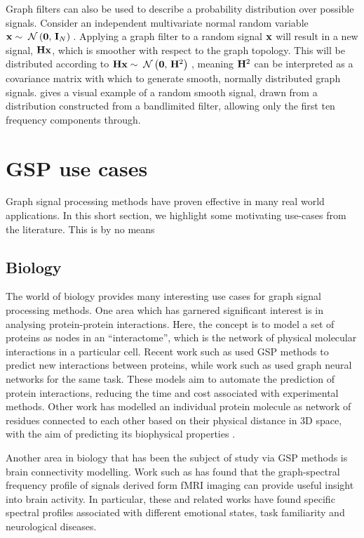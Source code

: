 Graph filters can also be used to describe a probability distribution over possible signals. Consider an independent multivariate normal random variable $\mathbf{x} \sim \; \mathcal{N}\left(\mathbf{0}, \, \mathbf{I}_N\right) \;$. Applying a graph filter to a random signal $\mathbf{x}$ will result in a new signal, $\mathbf{H} \mathbf{x}$, which is smoother with respect to the graph topology. This will be distributed according to $\mathbf{H} \mathbf{x} \sim \; \mathcal{N}\left(\mathbf{0}, \, \mathbf{H}^2\right) \;$, meaning $\mathbf{H}^2$ can be interpreted as a covariance matrix with which to generate smooth, normally distributed graph signals.  gives a visual example of a random smooth signal, drawn from a distribution constructed from a bandlimited filter, allowing only the first ten frequency components through. 



\section{GSP use cases}

Graph signal processing methods have proven effective in many real world applications. In this short section, we highlight some motivating use-cases from the literature. This is by no means 

\subsection{Biology}

The world of biology provides many interesting use cases for graph signal processing methods. One area which has garnered significant interest is in analysing protein-protein interactions. Here, the concept is to model a set of proteins as nodes in an ``interactome'', which is the network of physical molecular interactions in a particular cell. Recent work such as \cite{Colonnese2021} used GSP methods to predict new interactions between proteins, while work such as \cite{Jha2022} used graph neural networks for the same task. These models aim to automate the prediction of protein interactions, reducing the time and cost associated with experimental methods. Other work has modelled an individual protein molecule as network of residues connected to each other based on their physical distance in 3D space, with the aim of predicting its biophysical properties \citep{Srivastava2023}. 

Another area in biology that has been the subject of study via GSP methods is brain connectivity modelling. Work such as \cite{Goldsberry2017,Atasoy2016,Menoret2017} has found that the graph-spectral frequency profile of signals derived form fMRI imaging can provide useful insight into brain activity. In particular, these and related works have found specific spectral profiles associated with different emotional states, task familiarity and neurological diseases. 

